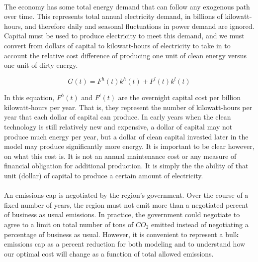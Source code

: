 \documentclass[singlespace]{easychithesis}
\begin{document}


\paragraph{} The economy has some total energy demand that can follow any exogenous path over time. This represents total annual electricity demand, in billions of kilowatt-hours, and therefore daily and seasonal fluctuations in power demand are ignored. Capital must be used to produce electricity to meet this demand, and we must convert from dollars of capital to kilowatt-hours of electricity to take in to account the relative cost difference of producing one unit of clean energy versus one unit of dirty energy. 

\begin{equation}\label{eq:simpleGenConstraint}
G(t) = F^h(t) k^h(t) + F^l(t) k^l(t)
\end{equation}

In this equation, $F^h (t)$ and $F^l (t)$ are the overnight capital cost per billion kilowatt-hours per year. That is, they represent the number of kilowatt-hours per year that each dollar of capital can produce. In early years when the clean technology is still relatively new and expensive, a dollar of capital may not produce much energy per year, but a dollar of clean capital invested later in the model may produce significantly more energy. It is important to be clear however, on what this cost is. It is not an annual maintenance cost or any measure of financial obligation for additional production. It is simply the the ability of that unit (dollar) of capital to produce a certain amount of electricity. 



\paragraph{} An emissions cap is negotiated by the region's government. Over the course of a fixed number of years, the region must not emit more than a negotiated percent of business as usual emissions. In practice, the government could negotiate to agree to a limit on total number of tons of $CO_2$ emitted instead of negotiating a percentage of business as usual. However, it is convenient to represent a bulk emissions cap as a percent reduction for both modeling and to understand how our optimal cost will change as a function of total allowed emissions.
\end{document}
